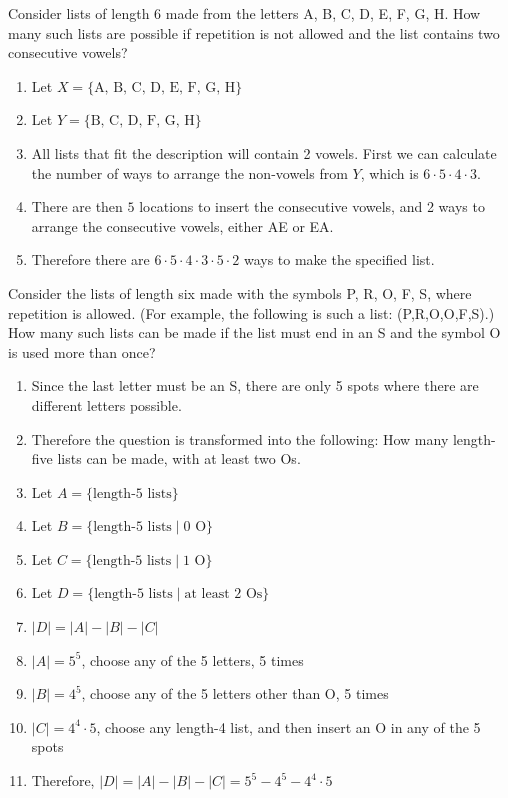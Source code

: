 \documentclass[openany, 12pt]{book}
\begin{document}
\begin{exercise}{}{}
	Consider lists of length 6 made from the letters A, B, C,
	D, E, F, G, H. How many such lists are possible if repetition is not allowed
	and the list contains two consecutive vowels?
	\begin{enumerate}[label={}, leftmargin=*, itemsep=0pt, parsep=0pt]
		\item Let $X=\{\text{A, B, C, D, E, F, G, H}\}$
		\item Let $Y=\{\text{B, C, D, F, G, H}\}$
		\item All lists that fit the description will contain 2 vowels. First we can
		      calculate the number of ways to arrange the non-vowels from $Y$, which is
		      $6\cdot5\cdot4\cdot3$.
		\item There are then $5$ locations to insert the consecutive vowels, and 2 ways
		      to arrange the consecutive vowels, either AE or EA.
		\item Therefore there are $6\cdot5\cdot4\cdot3 \cdot 5 \cdot 2$ ways to make the
		      specified list.
	\end{enumerate}
\end{exercise}

\begin{exercise}{}{}
	Consider the lists of length six made with the symbols P, R, O, F, S,
	where repetition is allowed. (For example, the following is such a list:
	(P,R,O,O,F,S).) How many such lists can be made if the list must end in an S
	and the symbol O is used more than once?
	\begin{enumerate}[label={\textbullet}, leftmargin=*, itemsep=0pt, parsep=0pt]
		\item Since the last letter must be an S, there are only 5 spots where there are
		      different letters possible.
		\item Therefore the question is transformed into the following: How many
		      \mbox{length-five} lists can be made, with at least two Os.
		\item Let $A=\{\text{length-5 lists}\}$
		\item Let $B=\{\text{length-5 lists}\mid\text{0 O}\}$
		\item Let $C=\{\text{length-5 lists}\mid\text{1 O}\}$
		\item Let $D=\{\text{length-5 lists}\mid\text{at least 2 Os}\}$
		\item $|D| = |A| - |B| - |C|$
		\item $|A| = 5^5$, choose any of the 5 letters, 5 times
		\item $|B| = 4^5$, choose any of the 5 letters other than O, 5 times
		\item $|C| = 4^4 \cdot 5$, choose any length-4 list, and then insert an O in any
		      of the 5 spots
		\item Therefore, $|D| = |A| - |B| - |C| = 5^5 - 4^5 - 4^4 \cdot 5$
	\end{enumerate}
\end{exercise}
\end{document}
